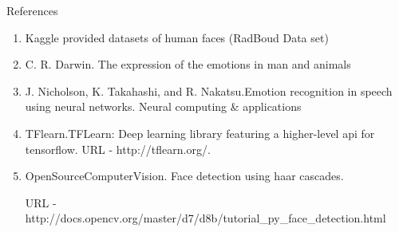 \begin{center}
	{\Huge References}
\end{center}

\begin{enumerate}
	\item Kaggle provided datasets of human faces (RadBoud Data set)
	\item C. R. Darwin. The expression of the emotions in man and animals
	\item J. Nicholson, K. Takahashi, and R. Nakatsu.Emotion recognition in speech using neural networks. Neural computing \& applications
	\item TFlearn.TFLearn: Deep learning library featuring a higher-level api for tensorflow. URL - http://tflearn.org/.
	\item OpenSourceComputerVision. Face detection using haar cascades. 
	
	URL - http://docs.opencv.org/master/d7/d8b/tutorial\_py\_face\_detection.html
\end{enumerate}